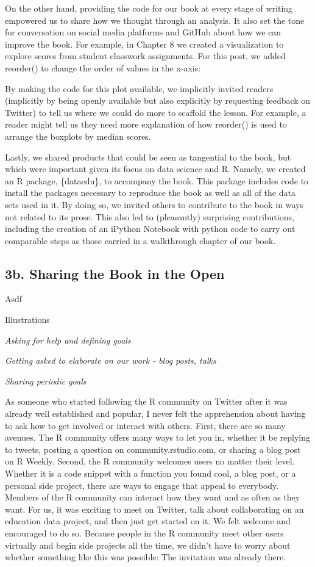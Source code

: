 \documentclass[
  english,
  man]{apa6}
\begin{document}
On the other hand, providing the code for our book at every stage of writing empowered us to share how we thought through an analysis. It also set the tone for conversation on social media platforms and GitHub about how we can improve the book. For example, in Chapter 8 we created a visualization to explore scores from student classwork assignments. For this post, we added reorder() to change the order of values in the x-axis:

By making the code for this plot available, we implicitly invited readers (implicitly by being openly available but also explicitly by requesting feedback on Twitter) to tell us where we could do more to scaffold the lesson. For example, a reader might tell us they need more explanation of how reorder() is used to arrange the boxplots by median scores.

Lastly, we shared products that could be seen as tangential to the book, but which were important given its focus on data science and R. Namely, we created an R package, \{dataedu\}, to accompany the book. This package includes code to install the packages necessary to reproduce the book as well as all of the data sets used in it. By doing so, we invited others to contribute to the book in ways not related to its prose. This also led to (pleasantly) surprising contributions, including the creation of an iPython Notebook with python code to carry out comparable steps as those carried in a walkthrough chapter of our book.

\hypertarget{b.-sharing-the-book-in-the-open}{%
\subsection{3b. Sharing the Book in the Open}\label{b.-sharing-the-book-in-the-open}}

Asdf

Illustrations

\emph{Asking for help and defining goals}

\emph{Getting asked to elaborate on our work - blog posts, talks}

\emph{Sharing periodic goals}

As someone who started following the R community on Twitter after it was already well established and popular, I never felt the apprehension about having to ask how to get involved or interact with others. First, there are so many avenues. The R community offers many ways to let you in, whether it be replying to tweets, posting a question on community.rstudio.com, or sharing a blog post on R Weekly. Second, the R community welcomes users no matter their level. Whether it is a code snippet with a function you found cool, a blog post, or a personal side project, there are ways to engage that appeal to everybody. Members of the R community can interact how they want and as often as they want. For us, it was exciting to meet on Twitter, talk about collaborating on an education data project, and then just get started on it. We felt welcome and encouraged to do so. Because people in the R community meet other users virtually and begin side projects all the time, we didn't have to worry about whether something like this was possible: The invitation was already there.
\end{document}
